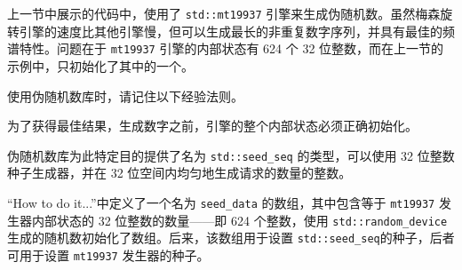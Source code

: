 
上一节中展示的代码中，使用了 \verb|std::mt19937| 引擎来生成伪随机数。虽然梅森旋转引擎的速度比其他引擎慢，但可以生成最长的非重复数字序列，并具有最佳的频谱特性。问题在于 \verb|mt19937| 引擎的内部状态有 624 个 32 位整数，而在上一节的示例中，只初始化了其中的一个。

使用伪随机数库时，请记住以下经验法则。

\begin{myNotic}
为了获得最佳结果，生成数字之前，引擎的整个内部状态必须正确初始化。
\end{myNotic}

伪随机数库为此特定目的提供了名为 \verb|std::seed_seq| 的类型，可以使用 32 位整数种子生成器，并在 32 位空间内均匀地生成请求的数量的整数。

“How to do it...”中定义了一个名为 \verb|seed_data| 的数组，其中包含等于 \verb|mt19937| 发生器内部状态的 32 位整数的数量——即 624 个整数，使用 \verb|std::random_device| 生成的随机数初始化了数组。后来，该数组用于设置 \verb|std::seed_seq|的种子，后者可用于设置 \verb|mt19937| 发生器的种子。